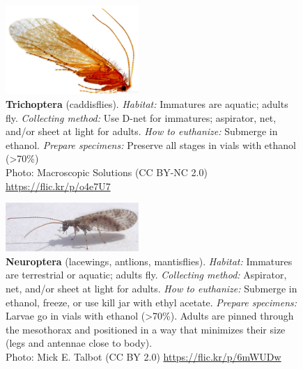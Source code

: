 \documentclass[letterpaper, 11pt]{article}
\begin{document}
\begin{figure}
  \caption*{\textbf{Trichoptera} (caddisflies). \textit{Habitat:} Immatures are aquatic; adults fly. \textit{Collecting method:} Use D-net for immatures; aspirator, net, and/or sheet at light for adults. \textit{How to euthanize:} Submerge in ethanol. \textit{Prepare specimens:} Preserve all stages in vials with ethanol (\textgreater70\%)\\ Photo: Macroscopic Solutions (CC BY-NC 2.0) \url{https://flic.kr/p/o4e7U7}}
  \includegraphics[width=0.45\textwidth]{Trichoptera}
\end{figure}

\clearpage

\begin{figure}
  \caption*{\textbf{Neuroptera} (lacewings, antlions, mantisflies).
  \textit{Habitat:} Immatures are terrestrial or aquatic; adults fly. \textit{Collecting method:} Aspirator, net, and/or sheet at light for adults. \textit{How to euthanize:} Submerge in ethanol, freeze, or use kill jar with ethyl acetate. \textit{Prepare specimens:} Larvae go in vials with ethanol (\textgreater70\%). Adults are pinned through the mesothorax and positioned in a way that minimizes their size (legs and antennae close to body).\\ Photo: Mick E. Talbot (CC BY 2.0) \url{https://flic.kr/p/6mWUDw}}
  \includegraphics[width=0.45\textwidth]{Neuroptera}
\end{figure}
\end{document}
